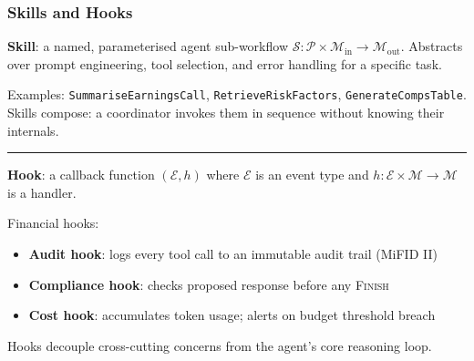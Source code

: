 \documentclass[9pt,t]{beamer}
\begin{document}
\begin{frame}
\frametitle{Skills and Hooks}

\textbf{Skill}: a named, parameterised agent sub-workflow
$\mathcal{S}: \mathcal{P} \times \mathcal{M}_{\text{in}} \to \mathcal{M}_{\text{out}}$.
Abstracts over prompt engineering, tool selection, and error handling for a specific task.

\medskip
Examples: \texttt{SummariseEarningsCall}, \texttt{RetrieveRiskFactors},
\texttt{GenerateCompsTable}. Skills compose: a coordinator invokes them in sequence
without knowing their internals.

\medskip
\rule{\textwidth}{0.4pt}

\textbf{Hook}: a callback function $(\mathcal{E}, h)$ where $\mathcal{E}$ is an event type
and $h: \mathcal{E} \times \mathcal{M} \to \mathcal{M}$ is a handler.

\medskip
Financial hooks:
\begin{itemize}
  \item \textbf{Audit hook}: logs every tool call to an immutable audit trail (MiFID II)
  \item \textbf{Compliance hook}: checks proposed response before any \textsc{Finish}
  \item \textbf{Cost hook}: accumulates token usage; alerts on budget threshold breach
\end{itemize}

Hooks decouple cross-cutting concerns from the agent's core reasoning loop.
\end{frame}
\end{document}

